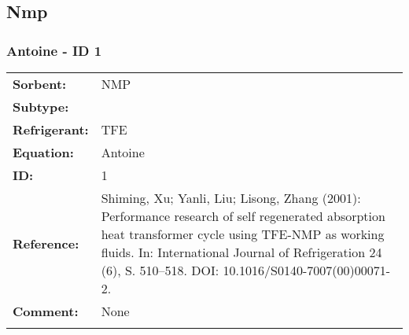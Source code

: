 \subsection{Nmp }
%
\subsubsection{Antoine - ID 1}
%
\begin{tabular}[l]{|lp{11.5cm}|}
\hline
\addlinespace

\textbf{Sorbent:} & NMP \\
\textbf{Subtype:} &  \\
\textbf{Refrigerant:} & TFE \\
\textbf{Equation:} & Antoine \\
\textbf{ID:} & 1 \\
\textbf{Reference:} & Shiming, Xu; Yanli, Liu; Lisong, Zhang (2001): Performance research of self regenerated absorption heat transformer cycle using TFE-NMP as working fluids. In: International Journal of Refrigeration 24 (6), S. 510–518. DOI: 10.1016/S0140-7007(00)00071-2. \\
\textbf{Comment:} & None \\

\addlinespace
\hline
\end{tabular}
\newline

